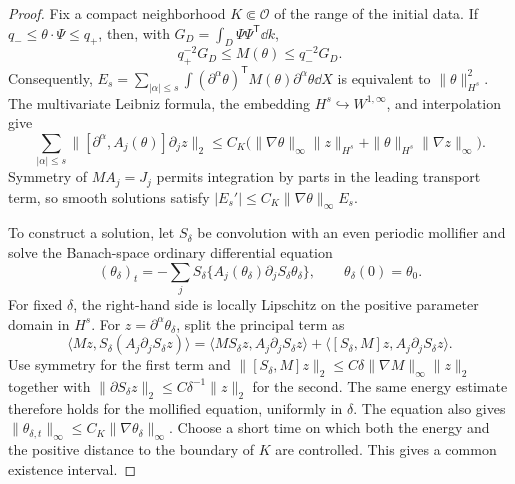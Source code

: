\begin{proof}
 Fix a compact neighborhood $K\Subset\mathcal O$ of the range of the
 initial data. If $q_-\le\theta\cdot\Psi\le q_+$, then, with
 $G_D=\int_D\Psi\Psi^{\mathsf T}\dd k$,
 \[
 q_+^{-2}G_D\le M(\theta)\le q_-^{-2}G_D.
 \]
 Consequently,
 $E_s=\sum_{|\alpha|\le s}\int (\partial^\alpha\theta)^{\mathsf T}
 M(\theta)\partial^\alpha\theta\dd X$ is equivalent to
 $\|\theta\|_{H^s}^2$. The multivariate Leibniz formula, the embedding
 $H^s\hookrightarrow W^{1,\infty}$, and interpolation give
 \begin{equation}\label{hyd:euler-comm}
 \sum_{|\alpha|\le s}
 \|[\partial^\alpha,A_j(\theta)]\partial_jz\|_2
 \le C_K\bigl(\|\nabla\theta\|_\infty\|z\|_{H^s}
                   +\|\theta\|_{H^s}\|\nabla z\|_\infty\bigr).
 \end{equation}
 Symmetry of $MA_j=J_j$ permits integration by parts in the leading
 transport term, so smooth solutions satisfy
 $|E_s'|\le C_K\|\nabla\theta\|_\infty E_s$.

 To construct a solution, let $S_\delta$ be convolution with an even
 periodic mollifier and solve the Banach-space ordinary differential
 equation
 \[
 (\theta_\delta)_t
 =-\sum_jS_\delta\{A_j(\theta_\delta)
                         \partial_jS_\delta\theta_\delta\},
 \qquad \theta_\delta(0)=\theta_0.
 \]
 For fixed $\delta$, the right-hand side is locally Lipschitz on the
 positive parameter domain in $H^s$. For
 $z=\partial^\alpha\theta_\delta$, split the principal term as
 \[
 \langle Mz,S_\delta(A_j\partial_jS_\delta z)\rangle
 =\langle MS_\delta z,A_j\partial_jS_\delta z\rangle
  +\langle[S_\delta,M]z,A_j\partial_jS_\delta z\rangle.
 \]
 Use symmetry for the first term and
 $\|[S_\delta,M]z\|_2\le C\delta\|\nabla M\|_\infty\|z\|_2$
 together with
 $\|\partial S_\delta z\|_2\le C\delta^{-1}\|z\|_2$ for the second.
 The same energy estimate therefore holds for the mollified equation,
 uniformly in $\delta$. The equation also gives
 $\|\theta_{\delta,t}\|_\infty
 \le C_K\|\nabla\theta_\delta\|_\infty$.
 Choose a short time on which both the energy and the positive distance
 to the boundary of $K$ are controlled. This gives a common existence
 interval.


\end{proof}
